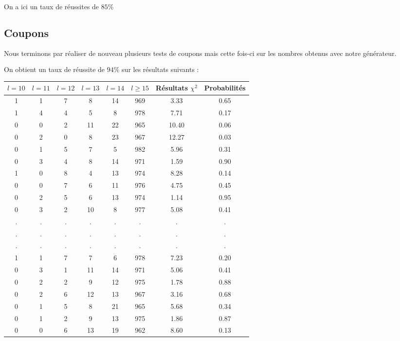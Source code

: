 \documentclass[12pt,a4paper]{article}
\begin{document}
On a ici un taux de réussites de $85\%$

\subsection*{Coupons}

Nous terminons par réaliser de nouveau plusieurs tests de coupons mais cette fois-ci sur les nombres obtenus avec notre générateur.

On obtient un taux de réussite de $94\%$ sur les résultats suivants :

\begin{center}
\begin{tabular}{|c|c|c|c|c|c|c|c|}
\hline
$l = 10$ & $l = 11$ & $l = 12$ & $l = 13$ & $l = 14$ & $l \geq 15$ & Résultats $\chi^2$ & Probabilités \\ \hline
1 & 1 & 7 & 8 & 14 & 969 &  3.33 &  0.65\\ \hline
1 & 4 & 4 & 5 & 8 & 978 &  7.71 &  0.17\\ \hline
0 & 0 & 2 & 11 & 22 & 965 & 10.40 &  0.06\\ \hline
0 & 2 & 0 & 8 & 23 & 967 & 12.27 &  0.03\\ \hline
0 & 1 & 5 & 7 & 5 & 982 &  5.96 &  0.31\\ \hline
0 & 3 & 4 & 8 & 14 & 971 &  1.59 &  0.90\\ \hline
1 & 0 & 8 & 4 & 13 & 974 &  8.28 &  0.14\\ \hline
0 & 0 & 7 & 6 & 11 & 976 &  4.75 &  0.45\\ \hline
0 & 2 & 5 & 6 & 13 & 974 &  1.14 &  0.95\\ \hline
0 & 3 & 2 & 10 & 8 & 977 &  5.08 &  0.41\\ \hline
 . & . & . & . & . & . & . & .\\ \hline
 . & . & . & . & . & . & . & .\\ \hline
 . & . & . & . & . & . & . & .\\ \hline
1 & 1 & 7 & 7 & 6 & 978 &  7.23 &  0.20\\ \hline
0 & 3 & 1 & 11 & 14 & 971 &  5.06 &  0.41\\ \hline
0 & 2 & 2 & 9 & 12 & 975 &  1.78 &  0.88\\ \hline
0 & 2 & 6 & 12 & 13 & 967 &  3.16 &  0.68\\ \hline
0 & 1 & 5 & 8 & 21 & 965 &  5.68 &  0.34\\ \hline
0 & 1 & 2 & 9 & 13 & 975 &  1.86 &  0.87\\ \hline
0 & 0 & 6 & 13 & 19 & 962 &  8.60 &  0.13\\ \hline

\end{tabular}
\end{center}
\end{document}
